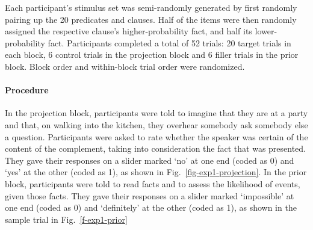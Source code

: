 \documentclass[11pt,fleqn]{article}
\newcommand{\figref}[1]{Fig.~\ref{#1}}
\newcommand{\6}{\mbox{$[\hspace*{-.6mm}[$}}
\newcommand{\9}{\mbox{$]\hspace*{-.6mm}]$}}
\begin{document}
Each participant's stimulus set was semi-randomly generated by first randomly pairing up the 20 predicates and clauses. Half of the items were then randomly assigned the respective clause's higher-probability fact, and half its lower-probability fact. Participants completed a total of 52 trials: 20 target trials in each block, 6 control trials in the projection block and 6 filler trials in the prior block. %
Block order and within-block trial order were randomized.

\paragraph{Procedure} In the projection block, participants were told to imagine that they are at a party and that, on walking into the kitchen, they overhear somebody ask somebody else a question. Participants were asked to rate whether the speaker was certain of the content of the complement, taking into consideration the fact that was presented. They gave their responses on a slider marked `no' at one end (coded as 0) and `yes' at the other (coded as 1), as shown in \figref{fig-exp1-projection}. In the prior block, participants were told to read facts and to assess the likelihood of events, given those facts. They gave their responses on a slider marked `impossible' at one end (coded as 0) and `definitely' at the other (coded as 1), as shown in the sample trial in  \figref{f-exp1-prior}
\end{document}
